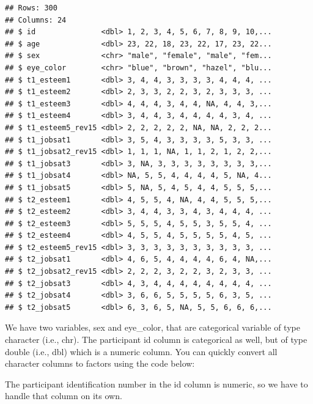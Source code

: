 \documentclass[
]{krantz}
\makeatletter
\newenvironment{Shaded}{\begin{snugshade}}{\end{snugshade}}
\newcommand{\DataTypeTok}[1]{\textcolor[rgb]{0.27,0.27,0.27}{#1}}
\newcommand{\KeywordTok}[1]{\textcolor[rgb]{0.27,0.27,0.27}{\textbf{#1}}}
\newcommand{\NormalTok}[1]{#1}
\newcommand{\OperatorTok}[1]{\textcolor[rgb]{0.43,0.43,0.43}{\textbf{#1}}}
\newcommand{\StringTok}[1]{\textcolor[rgb]{0.5,0.5,0.5}{#1}}
\newenvironment{kframe}{%
\medskip{}
\setlength{\fboxsep}{.8em}
 \def\at@end@of@kframe{}%
 \ifinner\ifhmode%
  \def\at@end@of@kframe{\end{minipage}}%
  \begin{minipage}{\columnwidth}%
 \fi\fi%
 \def\FrameCommand##1{\hskip\@totalleftmargin \hskip-\fboxsep
 \colorbox{shadecolor}{##1}\hskip-\fboxsep
     \hskip-\linewidth \hskip-\@totalleftmargin \hskip\columnwidth}%
 \MakeFramed {\advance\hsize-\width
   \@totalleftmargin\z@ \linewidth\hsize
   \@setminipage}}%
 {\par\unskip\endMakeFramed%
 \at@end@of@kframe}
\renewenvironment{Shaded}{\begin{kframe}}{\end{kframe}}
\makeatother
\begin{document}
\begin{verbatim}
## Rows: 300
## Columns: 24
## $ id               <dbl> 1, 2, 3, 4, 5, 6, 7, 8, 9, 10,...
## $ age              <dbl> 23, 22, 18, 23, 22, 17, 23, 22...
## $ sex              <chr> "male", "female", "male", "fem...
## $ eye_color        <chr> "blue", "brown", "hazel", "blu...
## $ t1_esteem1       <dbl> 3, 4, 4, 3, 3, 3, 3, 4, 4, 4, ...
## $ t1_esteem2       <dbl> 2, 3, 3, 2, 2, 3, 2, 3, 3, 3, ...
## $ t1_esteem3       <dbl> 4, 4, 4, 3, 4, 4, NA, 4, 4, 3,...
## $ t1_esteem4       <dbl> 3, 4, 4, 3, 4, 4, 4, 4, 3, 4, ...
## $ t1_esteem5_rev15 <dbl> 2, 2, 2, 2, 2, NA, NA, 2, 2, 2...
## $ t1_jobsat1       <dbl> 3, 5, 4, 3, 3, 3, 3, 5, 3, 3, ...
## $ t1_jobsat2_rev15 <dbl> 1, 1, 1, NA, 1, 1, 2, 1, 2, 2,...
## $ t1_jobsat3       <dbl> 3, NA, 3, 3, 3, 3, 3, 3, 3, 3,...
## $ t1_jobsat4       <dbl> NA, 5, 5, 4, 4, 4, 4, 5, NA, 4...
## $ t1_jobsat5       <dbl> 5, NA, 5, 4, 5, 4, 4, 5, 5, 5,...
## $ t2_esteem1       <dbl> 4, 5, 5, 4, NA, 4, 4, 5, 5, 5,...
## $ t2_esteem2       <dbl> 3, 4, 4, 3, 3, 4, 3, 4, 4, 4, ...
## $ t2_esteem3       <dbl> 5, 5, 5, 4, 5, 5, 3, 5, 5, 4, ...
## $ t2_esteem4       <dbl> 4, 5, 5, 4, 5, 5, 5, 5, 4, 5, ...
## $ t2_esteem5_rev15 <dbl> 3, 3, 3, 3, 3, 3, 3, 3, 3, 3, ...
## $ t2_jobsat1       <dbl> 4, 6, 5, 4, 4, 4, 4, 6, 4, NA,...
## $ t2_jobsat2_rev15 <dbl> 2, 2, 2, 3, 2, 2, 3, 2, 3, 3, ...
## $ t2_jobsat3       <dbl> 4, 3, 4, 4, 4, 4, 4, 4, 4, 4, ...
## $ t2_jobsat4       <dbl> 3, 6, 6, 5, 5, 5, 5, 6, 3, 5, ...
## $ t2_jobsat5       <dbl> 6, 3, 6, 5, NA, 5, 5, 6, 6, 6,...
\end{verbatim}

We have two variables, sex and eye\_color, that are categorical variable of type character (i.e., chr). The participant id column is categorical as well, but of type double (i.e., dbl) which is a numeric column. You can quickly convert all character columns to factors using the code below:

\begin{Shaded}
\end{Shaded}

The participant identification number in the id column is numeric, so we have to handle that column on its own.
\end{document}
